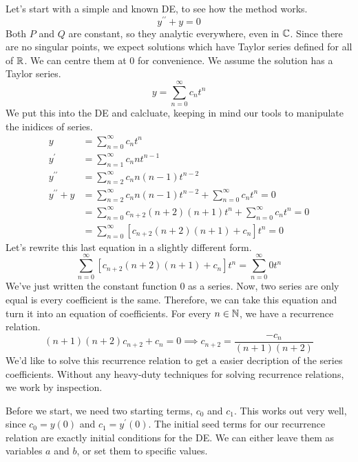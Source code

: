 \documentclass[fleqn,letterpaper]{report}
\begin{document}
\begin{example}
Let's start with a simple and known DE, to see how the method
works. 
\begin{equation*}
y^{\prime \prime} + y = 0 
\end{equation*}
Both $P$ and $Q$ are constant, so they analytic everywhere,
even in $\mathbb{C}$. Since there are no singular points, we expect
solutions which have Taylor series defined for all of $\mathbb{R}$.
We can centre them at $0$ for convenience. We assume the solution has
a Taylor series.
\begin{equation*}
y = \sum_{n=0}^\infty c_n t^n
\end{equation*}
We put this into the DE and calcluate, keeping in mind our
tools to manipulate the inidices of series.
\begin{align*}
y & = \sum_{n=0}^\infty c_n t^n \\
y^\prime & = \sum_{n=1}^\infty c_n nt^{n-1} \\
y^{\prime\prime} & = \sum_{n=2}^\infty c_n n(n-1)t^{n-2} \\
y^{\prime \prime} + y & = \sum_{n=2}^\infty c_n n(n-1)t^{n-2} +
\sum_{n=0}^\infty c_n t^n  = 0 \\
& = \sum_{n=0}^\infty c_{n+2}(n+2)(n+1)t^n + \sum_{n=0}^\infty
c_n t^n = 0 \\
& = \sum_{n=0}^\infty \left[ c_{n+2}(n+2)(n+1) + c_n \right] t^n
= 0
\end{align*}
Let's rewrite this last equation in a slightly different form.
\begin{equation*}
\sum_{n=0}^\infty \left[ c_{n+2}(n+2)(n+1) + c_n \right] t^n
= \sum_{n=0}^\infty 0 t^n 
\end{equation*}
We've just written the constant function $0$ as a series.
Now, two series are only equal is every coefficient is the
same. Therefore, we can take this equation and turn it into
an equation of coefficients. For every $n \in \mathbb{N}$, we have a
recurrence relation.
\begin{equation*}
(n+1)(n+2)c_{n+2} + c_n = 0 \implies c_{n+2} =
\frac{-c_n}{(n+1)(n+2)} 
\end{equation*}
We'd like to solve this recurrence relation to get a
easier decription of the series coefficients. Without any
heavy-duty techniques for solving recurrence relations, we
work by inspection.

Before we start, we need two starting terms, $c_0$ and $c_1$.
This works out very well, since $c_0 = y(0)$ and $c_1 =
y^\prime(0)$. The initial seed terms for our recurrence
relation are exactly initial conditions for the DE. We can
either leave them as variables $a$ and $b$, or set them to
specific values.


\end{example}
\end{document}
